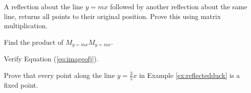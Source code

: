 \documentclass{ximera}
\begin{document}
\begin{problem}\label{prob:reflectreflect} A reflection about the line $y=mx$ followed by another reflection about the same line, returns all points to their original position.  Prove this using matrix multiplication.
\begin{hint}
    Find the product of $M_{y=mx}M_{y=mx}$.
\end{hint}
\end{problem}

\begin{problem} \label{prob:imageofj}
Verify Equation (\ref{eq:imageofj}).
\end{problem}

\begin{problem}\label{prob:fixedpoint}
Prove that every point along the line $y=\frac{3}{5}x$ in Example \ref{ex:reflectedduck} is a fixed point.
\end{problem}
\end{document}
